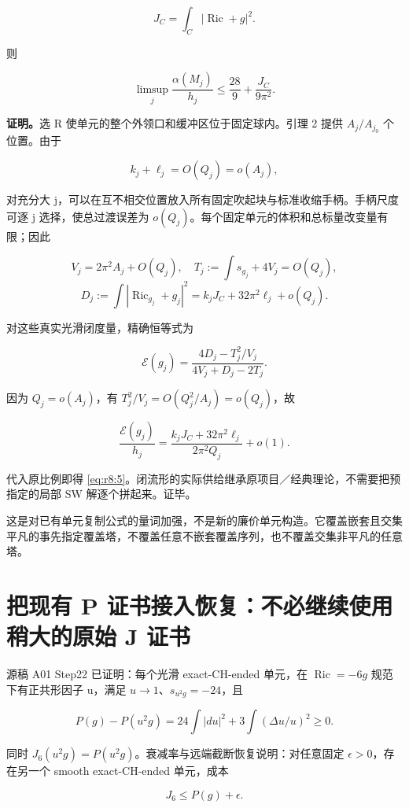 \documentclass[UTF8,11pt,fontset=none]{ctexart}
\begin{document}
\[
J_C=\int_C|\operatorname{Ric}+g|^2.
\]

则

\[
\boxed{\limsup_j\frac{\alpha(M_j)}{h_j}
\le\frac{28}{9}+\frac{J_C}{9\pi^2}.}
\tag{8.5}\label{eq:r8:5}
\]

\textbf{证明。}选 R 使单元的整个外领口和缓冲区位于固定球内。引理 2 提供 \(A_j/A_{j_0}\) 个位置。由于

\[
k_j+\ell_j=O(Q_j)=o(A_j),
\]

对充分大 j，可以在互不相交位置放入所有固定吹起块与标准收缩手柄。手柄尺度可逐 j 选择，使总过渡误差为 \(o(Q_j)\)。每个固定单元的体积和总标量改变量有限；因此

\[
V_j=2\pi^2A_j+O(Q_j),\quad
T_j:=\int s_{g_j}+4V_j=O(Q_j),
\] \[
D_j:=\int|\operatorname{Ric}_{g_j}+g_j|^2
=k_jJ_C+32\pi^2\ell_j+o(Q_j).
\]

对这些真实光滑闭度量，精确恒等式为

\[
\mathcal E(g_j)=
\frac{4D_j-T_j^2/V_j}{4V_j+D_j-2T_j}.
\tag{8.6}\label{eq:r8:6}
\]

因为 \(Q_j=o(A_j)\)，有 \(T_j^2/V_j=O(Q_j^2/A_j)=o(Q_j)\)，故

\[
\frac{\mathcal E(g_j)}{h_j}
=\frac{k_jJ_C+32\pi^2\ell_j}{2\pi^2Q_j}+o(1).
\]

代入原比例即得 \eqref{eq:r8:5}。闭流形的实际供给继承原项目／经典理论，不需要把预指定的局部 SW 解逐个拼起来。证毕。

这是对已有单元复制公式的量词加强，不是新的廉价单元构造。它覆盖嵌套且交集平凡的事先指定覆盖塔，不覆盖任意不嵌套覆盖序列，也不覆盖交集非平凡的任意塔。

\section{把现有 P 证书接入恢复：不必继续使用稍大的原始 J 证书}\label{ch8:ux628aux73b0ux6709-p-ux8bc1ux4e66ux63a5ux5165ux6062ux590dux4e0dux5fc5ux7ee7ux7eedux4f7fux7528ux7a0dux5927ux7684ux539fux59cb-j-ux8bc1ux4e66}

源稿 A01 Step22 已证明：每个光滑 exact-CH-ended 单元，在 \(\operatorname{Ric}=-6g\) 规范下有正共形因子 u，满足 \(u\to1\)、\(s_{u^2g}=-24\)，且

\[
P(g)-P(u^2g)
=24\int|du|^2+3\int(\Delta u/u)^2\ge0.
\]

同时 \(J_6(u^2g)=P(u^2g)\)。衰减率与远端截断恢复说明：对任意固定 \(\epsilon>0\)，存在另一个 smooth exact-CH-ended 单元，成本

\[
J_6\le P(g)+\epsilon.
\tag{8.7}\label{eq:r8:7}
\]
\end{document}
